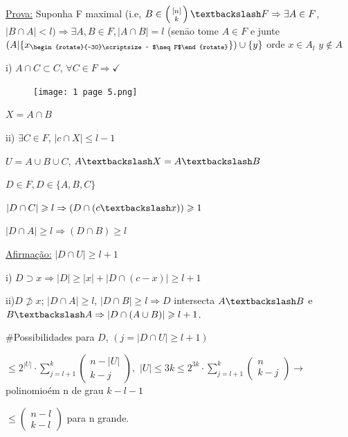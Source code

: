 \documentclass[a4paper,12pt]{article}
\renewcommand{\leq}{\ensuremath{\leqslant}}
\renewcommand{\geq}{\ensuremath{\geqslant}}
\theoremstyle{plain} %
\theoremstyle{definition} %
\theoremstyle{remark} %
\newcommand{\rotsup}[1]{\begin{rotate}{-30}\scriptsize ~#1\end{rotate}}%
\begin{document}
	\begin{framed}
		\underline{Prova:} Suponha F maximal (i.e, $B\in \left(\begin{smallmatrix}
			[n]\\
			k
		\end{smallmatrix}\right)\textbackslash F\Rightarrow \exists A\in F$, $|B\cap A|<l)\Rightarrow\exists A,B \in F, |A\cap B|=l$ (sen\=ao tome $A\in F$ e junte $(A|\{x_{\rotsup{ $\neq F$}}\})\cup\{y\}$ orde $x\in A_l$ $y\not\in A$
		
		i) $A\cap C\subset C$, $\forall C\in F\Rightarrow \checkmark$
		
		\begin{figure}
			\texttt{[image: 1 page 5.png]}
		\end{figure}
		
		$X=A\cap B$
		
		ii) $\exists C\in F$, $|c\cap X|\leqslant l-1$
		
		$U=A\cup B\cup C$, $A\textbackslash X=A\textbackslash B$
		
		$D\in F, D\in \{A,B,C\}$
		
		$|D\cap C|\geqslant l\Rightarrow (D\cap (c\textbackslash x))\geqslant 1$
		
		$|D\cap A|\geqslant l\Rightarrow (D\cap B)\geqslant l$
		
		\vspace{2ex}
		\underline{Afirma\c{c}\~ao:} $|D\cap U|\geqslant l+1$
		
		i) $D\supset x\Rightarrow |D|\geq |x|+|D\cap (c-x)|\geq l+1$
		
		ii)$D\not\supset x$; $|D\cap A|\geq l$, $|D\cap B|\geq l\Rightarrow D$ intersecta $A\textbackslash B$ e $B\textbackslash A\Rightarrow |D\cap (A\cup B)|\geq l+1$.
		
		\#Possibilidades  para $D$, $(j=|D\cap U|\geq l+1)$
		
		\vspace{2ex}
		$\leq 2^{|U|}\cdot\sum\limits_{j=l+1}^k \left(\begin{smallmatrix}
			n-|U|\\
			k-j
		\end{smallmatrix}\right),$ $|U|\leq 3k \leq 2^{3k}\cdot\sum\limits_{j=l+1}^k \left(\begin{smallmatrix}
			n\\
			k-j
		\end{smallmatrix}\right)\rightarrow$ polinomio\'em n de grau $k-l-1$
		
		$\leq \left(\begin{smallmatrix}
			n-l\\
			k-l
		\end{smallmatrix}\right)$ para n grande.
	\end{framed}
	
\end{document}

